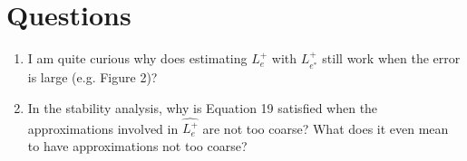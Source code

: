 \documentclass[10pt, twocolumn]{article}
\begin{document}
\section{Questions}
\begin{enumerate}
  \item I am quite curious why does estimating $L_e^+$ with $L_{e^*}^+$ still
    work when the error is large (e.g. Figure 2)?

  \item In the stability analysis, why is Equation 19 satisfied when the
    approximations involved in $\widehat{L_e^+}$ are not too coarse? What does
    it even mean to have approximations not too coarse?
\end{enumerate}
\end{document}
